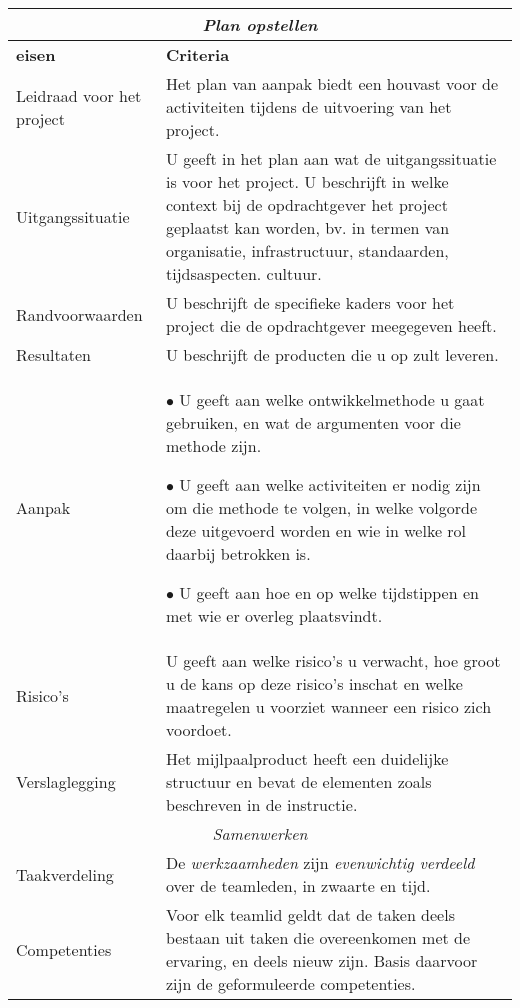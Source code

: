 {\small\sf
\begin{center}
    \begin{tabular}{|l|p{23em}|}
	\hline
	\multicolumn{2}{|c|}{\emph{Plan opstellen}}\\\hline
	{\bf eisen} & {\bf Criteria}\\\hline
	Leidraad voor het project &  Het plan van aanpak biedt een houvast  voor de
			    activiteiten tijdens de uitvoering van het project.
		\\\hline
	Uitgangssituatie & U geeft in het plan aan wat de uitgangssituatie is voor het
			project. U beschrijft in welke context bij de opdrachtgever het project
			geplaatst kan worden, bv. in termen van organisatie, infrastructuur,
			standaarden, tijdsaspecten. cultuur.
		\\\hline
	Randvoorwaarden & U beschrijft de specifieke kaders voor het project die de
			opdrachtgever meegegeven heeft.
		\\\hline
	Resultaten & U beschrijft de producten die u op zult leveren.
		\\\hline
	Aanpak &
	\par $\bullet$ U geeft aan welke ontwikkelmethode u gaat gebruiken, en wat de argumenten voor
		    die methode zijn.
	\par $\bullet$ U geeft aan welke activiteiten er nodig zijn om die methode te volgen,
		in welke volgorde deze uitgevoerd worden en wie in welke rol daarbij
		betrokken is.
	\par $\bullet$ U geeft aan hoe en op welke tijdstippen en met wie er overleg plaatsvindt.
		\\\hline
	Risico's & U geeft aan welke risico's u verwacht, hoe groot u de kans op deze
		    risico's inschat en welke maatregelen u voorziet wanneer een
		    risico zich voordoet.
		\\\hline
	Verslaglegging & Het mijlpaalproduct heeft een duidelijke structuur en
			bevat de elementen zoals beschreven in de instructie.
		\\\hline
	\multicolumn{2}{|c|}{\emph{Samenwerken}}\\\hline
	Taakverdeling & De \emph{werkzaamheden} zijn \emph{evenwichtig verdeeld} over de
				    teamleden, in zwaarte en tijd.
		\\\hline
	Competenties & Voor elk teamlid geldt dat de taken deels bestaan uit taken die
				    overeenkomen met de ervaring, en deels nieuw zijn.
				    Basis daarvoor zijn de geformuleerde competenties.
		\\\hline
    \end{tabular}
    \label{table: fase 2 beoordelingscriteria}
\end{center}
}%
